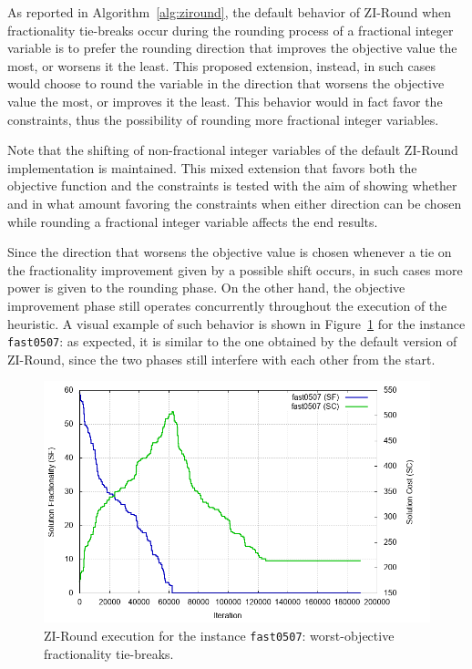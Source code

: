 \documentclass[a4paper,12pt]{book}
\begin{document}
As reported in Algorithm~\ref{alg:ziround}, the default behavior of ZI-Round when fractionality tie-breaks occur during the rounding process of a fractional integer variable is to prefer the rounding direction that improves the objective value the most, or worsens it the least. This proposed extension, instead, in such cases would choose to round the variable in the direction that worsens the objective value the most, or improves it the least. This behavior would in fact favor the constraints, thus the possibility of rounding more fractional integer variables. \par

Note that the shifting of non-fractional integer variables of the default ZI-Round implementation is maintained. This mixed extension that favors both the objective function and the constraints is tested with the aim of showing whether and in what amount favoring the constraints when either direction can be chosen while rounding a fractional integer variable affects the end results. \par 

Since the direction that worsens the objective value is chosen whenever a tie on the fractionality improvement given by a possible shift occurs, in such cases more power is given to the rounding phase. On the other hand, the objective improvement phase still operates concurrently throughout the execution of the heuristic. A visual example of such behavior is shown in Figure~\ref{fig:exzi-fractieworstobj} for the instance \texttt{fast0507}: as expected, it is similar to the one obtained by the default version of ZI-Round, since the two phases still interfere with each other from the start.
\begin{figure}[ht]
	\centering
	\includegraphics[width=\textwidth]{fast0507-fractieworstobj.png}
	\caption{ZI-Round execution for the instance \texttt{fast0507}: worst-objective fractionality tie-breaks.}
	\label{fig:exzi-fractieworstobj}
\end{figure}
\end{document}

